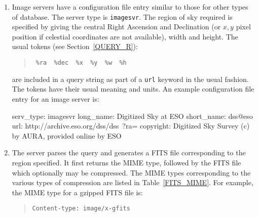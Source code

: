 \documentclass[twoside,11pt,nolof,chapters]{starlink}
\begin{document}
\begin{enumerate}

  \item Image servers have a configuration file entry similar to those
   for other types of database.  The server type is \texttt{imagesvr}.
   The region of sky required is specified by giving the central
   Right Ascension and Declination (or $x,y$\/ pixel position if
   celestial coordinates are not available), width and height.  The
   usual tokens (see Section~\ref{QUERY_R}):

  \begin{quote}
  \texttt{~\%ra ~\%dec ~\%x ~\%y ~\%w ~\%h}
  \end{quote}

   are included in a query string as part of a \texttt{url} keyword in the
   usual fashion.  The tokens have their usual meaning and units.  An
   example configuration file entry for an image server is:

\begin{terminalv}
serv_type:      imagesvr
long_name:      Digitized Sky at ESO
short_name:     dss@eso
url:            http://archive.eso.org/dss/dss\
?ra=%
copyright:      Digitized Sky Survey (c) by AURA, provided online by ESO
\end{terminalv}

  \item The server parses the query and generates a FITS file corresponding
   to the region specified.  It first returns the MIME type, followed
   by the FITS file which optionally may be compressed.  The MIME types
   corresponding to the various types of compression are listed in
   Table~\ref{FITS_MIME}.  For example, the MIME type for a gzipped
   FITS file is:

  \begin{quote}
   \texttt{Content-type: image/x-gfits}
  \end{quote}

\end{enumerate}
\end{document}

